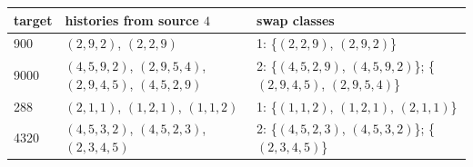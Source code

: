 \begin{tabular}{@{}lp{4.6cm}p{6.4cm}@{}}\toprule target & histories from source $4$ & swap classes\\\midrule
900 & $(2,9,2)$, $(2,2,9)$ & 1: \{$(2,2,9)$, $(2,9,2)$\}\\
9000 & $(4,5,9,2)$, $(2,9,5,4)$, $(2,9,4,5)$, $(4,5,2,9)$ & 2: \{$(4,5,2,9)$, $(4,5,9,2)$\}; \{$(2,9,4,5)$, $(2,9,5,4)$\}\\
288 & $(2,1,1)$, $(1,2,1)$, $(1,1,2)$ & 1: \{$(1,1,2)$, $(1,2,1)$, $(2,1,1)$\}\\
4320 & $(4,5,3,2)$, $(4,5,2,3)$, $(2,3,4,5)$ & 2: \{$(4,5,2,3)$, $(4,5,3,2)$\}; \{$(2,3,4,5)$\}\\
\bottomrule\end{tabular}
